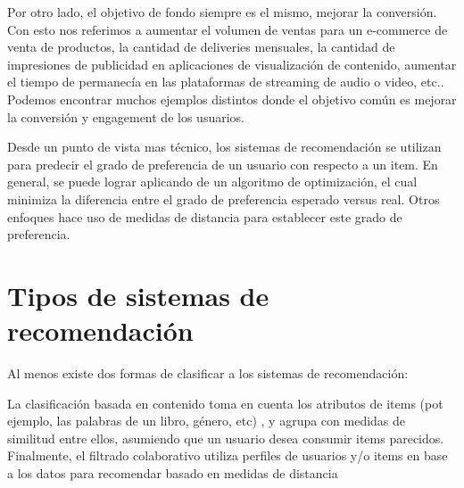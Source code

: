 \documentclass[11pt,a4paper]{tesis}
\begin{document}
Por otro lado, el objetivo de fondo siempre es el mismo, mejorar la conversión. Con esto nos referimos a aumentar el volumen de ventas para un e-commerce de venta de productos, la cantidad de deliveries mensuales, la cantidad de impresiones de publicidad  en aplicaciones de visualización de contenido, aumentar el tiempo de permanecía en las plataformas de streaming de audio o video, etc.. Podemos encontrar muchos ejemplos distintos donde el objetivo común es mejorar la conversión y engagement de los usuarios.

Desde un punto de vista mas técnico, los sistemas de recomendación se utilizan para predecir el grado de preferencia de un usuario con respecto a un item. 
En general, se puede lograr aplicando de un algoritmo de optimización, el cual minimiza la diferencia entre el grado de preferencia esperado versus real. Otros enfoques hace uso de medidas de distancia para establecer este grado de preferencia.

\section{Tipos de sistemas de recomendación}

Al menos existe dos formas de clasificar a los sistemas de recomendación:

 La clasificación basada en contenido toma en cuenta los atributos de items (pot ejemplo, las palabras de un libro, género, etc) , y agrupa con medidas de similitud entre ellos, asumiendo que un usuario desea consumir items parecidos. Finalmente, el filtrado colaborativo utiliza perfiles de usuarios y/o items en base a los datos para recomendar basado en medidas de distancia
\end{document}
